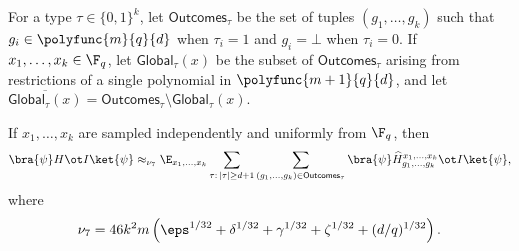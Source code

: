 \begin{definition}\label{def:outcomes-by-type}
	\leanok
	For a type $\tau \in \{0,1\}^k$, let $\mathsf{Outcomes}_\tau$ be the set of tuples $(g_1,\dots,g_k)$ such that $g_i \in \polyfunc{m}{q}{d}$ when $\tau_i=1$ and $g_i=\bot$ when $\tau_i=0$. If $x_1,\dots,x_k \in \F_q$, let $\mathsf{Global}_\tau(x)$ be the subset of $\mathsf{Outcomes}_\tau$ arising from restrictions of a single polynomial in $\polyfunc{m+1}{q}{d}$, and let $\overline{\mathsf{Global}_\tau(x)} = \mathsf{Outcomes}_\tau \setminus \mathsf{Global}_\tau(x)$.
\end{definition}

\begin{lemma}\label{lem:over-all-outcomes}
	\leanok
	If $x_1,\dots,x_k$ are sampled independently and uniformly from $\F_q$, then
	\[
		\bra{\psi} H \ot I \ket{\psi}
		\approx_{\nu_7}
		\E_{x_1,\dots,x_k} \sum_{\tau:\,|\tau|\ge d+1} \sum_{(g_1,\dots,g_k)\in \mathsf{Outcomes}_\tau}
		\bra{\psi} \widehat H_{g_1,\dots,g_k}^{x_1,\dots,x_k} \ot I \ket{\psi},
	\]
	where
	\[
		\nu_7 = 46k^2m\left(\eps^{1/32}+\delta^{1/32}+\gamma^{1/32}+\zeta^{1/32}+(d/q)^{1/32}\right).
	\]
\end{lemma}
